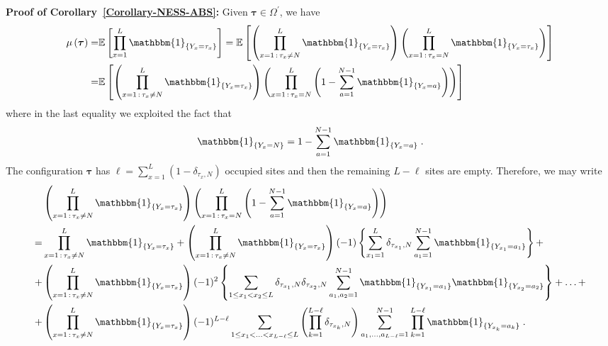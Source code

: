 \documentclass[10pt]{article}
\numberwithin{equation}{section}
\numberwithin{equation}{subsection}
\newcommand{\dt}{\;.}
\begin{document}
\textbf{Proof of Corollary~\ref{Corollary-NESS-ABS}:}
Given $\bm{\tau}\in \Omega^{'}$,  we have 
\begin{align}
	\mu\left(\bm{\tau}\right)=&\mathbb{E}\left[\prod_{x=1}^{L}\mathbbm{1}_{\{Y_{x}=\tau_{x}\}}\right]
	=\mathbb{E}\left[\left(\prod_{x=1\,:\,\tau_{x}\neq N}^{L}\mathbbm{1}_{\{Y_{x}=\tau_{x}\}}\right)\left(\prod_{x=1\,:\,\tau_{x}=N}^{L}\mathbbm{1}_{\{Y_{x}=\tau_x\}}\right)\right]\nonumber\\
	=&\mathbb{E}\left[\left(\prod_{x=1\,:\,\tau_{x}\neq N}^{L}\mathbbm{1}_{\{Y_{x}=\tau_{x}\}}\right)\left(\prod_{x=1\,:\,\tau_{x}=N}^{L}\left(1-\sum_{a=1}^{N-1}\mathbbm{1}_{\{Y_{x}=a\}}\right)\right)\right]
\end{align}
where in the last equality we exploited the fact that 
\begin{equation}\label{prova}			\mathbbm{1}_{\{Y_{x}=N\}}=1-\sum_{a=1}^{N-1}\mathbbm{1}_{\{Y_{x}=a\}}\dt
\end{equation}
The configuration $\bm{\tau}$ has $\ell=\sum_{x=1}^{L}(1-\delta_{\tau_{x},N})$ occupied sites and then the remaining $L-\ell$ sites are empty. 
Therefore, we may write
\begin{align}\label{sum}
&\left(\prod_{x=1\,:\,\tau_{x}\neq N}^{L}\mathbbm{1}_{\{Y_x=\tau_{x}\}}\right)\left(\prod_{x=1\,:\,\tau_{x}=N}^{L}\left(1-\sum_{a=1}^{N-1}\mathbbm{1}_{\{Y_x=a\}}\right)\right)\nonumber\\
=&
\prod_{x=1\,:\,\tau_{x}\neq N}^{L}\mathbbm{1}_{\{Y_x=\tau_{x}\}}+\left(\prod_{x=1\,:\,\tau_{x}\neq N}^{L}\mathbbm{1}_{\{Y_x=\tau_{x}\}}\right)(-1)\left\{\sum_{x_{1}=1}^{L}\delta_{\tau_{x_{1}},N}\sum_{a_{1}=1}^{N-1}\mathbbm{1}_{\{Y_{x_{1}}
=
a_{1}\}}\right\}+\nonumber\\
+&\left(\prod_{x=1\,:\,\tau_{x}\neq N}^{L}\mathbbm{1}_{\{Y_x=\tau_{x}\}}\right)(-1)^{2}\left\{\sum_{1\leq x_{1}<x_{2}\leq L}\delta_{\tau_{x_{1}},N}\delta_{\tau_{x_{2}},N}\sum_{a_{1},a_{2}=1}^{N-1}\mathbbm{1}_{\{Y_{x_{1}}=a_{1}\}}\mathbbm{1}_{\{Y_{x_{2}}=a_{2}\}}\right\}+\ldots+
\nonumber\\
+&\left(\prod_{x=1\,:\,\tau_{x}\neq N}^{L}\mathbbm{1}_{\{Y_x=\tau_{x}\}}\right)(-1)^{L-\ell}\sum_{1\leq x_{1}<\ldots<x_{L-\ell}\leq L}\left(\prod_{k=1}^{L-\ell}\delta_{\tau_{x_{k}},N}\right)\sum_{a_{1},\ldots,a_{L-\ell}=1}^{N-1}\prod_{k=1}^{L-\ell}\mathbbm{1}_{\{Y_{x_{k}}=a_{k}\}}\dt
\end{align} 
\end{document}

